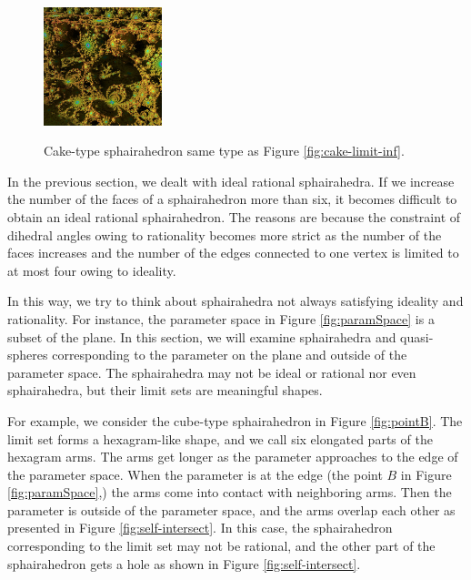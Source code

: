 \begin{figure}[h!tbp]
\begin{minipage}[t]{0.5\textwidth}
\begin{minipage}[t]{0.24\textwidth}
   \label{fig:cake-sphairahedron-broken}
  \end{minipage}
  \hspace*{\fill}
  \begin{minipage}[t]{0.24\textwidth}
   \centering
   \includegraphics[width=1.35in, height=1.35in, keepaspectratio]{./img/application/sphairahedron/breakingIdealityOrRationality/limit1228.jpg}
   \label{fig:cake-limit-broken}
  \end{minipage}
  \hspace*{\fill}
  \caption{Cake-type sphairahedron same type as Figure \ref{fig:cake-limit-inf}.}
  \label{fig:broken-sphairahedron}
 \end{minipage}
\end{figure}

\noindent
In the previous section, we dealt with ideal rational sphairahedra.
If we increase the number of the faces of a sphairahedron more than
six, it becomes difficult to obtain an ideal rational sphairahedron.
The reasons are because the constraint of dihedral angles owing to
rationality becomes more strict as the number of the faces increases
and the number of the edges connected to one vertex
is limited to at most four owing to ideality.


In this way, we try to think about sphairahedra not always satisfying
ideality and rationality.
For instance, the parameter space in Figure \ref{fig:paramSpace}
is a subset of the plane.
In this section, we will examine sphairahedra and quasi-spheres
corresponding to the parameter on the plane and outside of the
parameter space.
The sphairahedra may not be ideal or rational nor even sphairahedra, but
their limit sets are meaningful shapes.

For example, we consider the cube-type sphairahedron in Figure \ref{fig:pointB}.
The limit set forms a hexagram-like shape, and we call six elongated parts
of the hexagram arms.
The arms get longer as the parameter approaches to the edge of the
parameter space.
When the parameter is at the edge (the point $B$ in Figure \ref{fig:paramSpace},)
the arms come into contact with neighboring arms.
Then the parameter is outside of the parameter space, and the arms
overlap each other as presented in Figure
\ref{fig:self-intersect}.
In this case, the sphairahedron corresponding to the limit set
may not be rational, and the other part of the sphairahedron gets a hole
as shown in Figure \ref{fig:self-intersect}.

